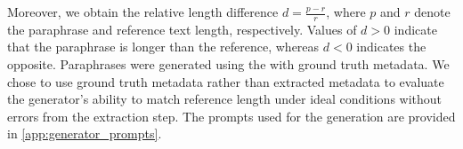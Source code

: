 Moreover, we obtain the relative length difference $d = \frac{p - r}{r}$, where $p$ and $r$ denote the paraphrase and reference text length, respectively. 
Values of $d > 0$ indicate that the paraphrase is longer than the reference, whereas $d < 0$ indicates the opposite.
Paraphrases were generated using the \pgenerator{} with ground truth metadata.
We chose to use ground truth metadata rather than extracted metadata to evaluate the generator's ability to match reference length under ideal conditions without errors from the extraction step.
The prompts used for the generation are provided in \autoref{app:generator_prompts}.
